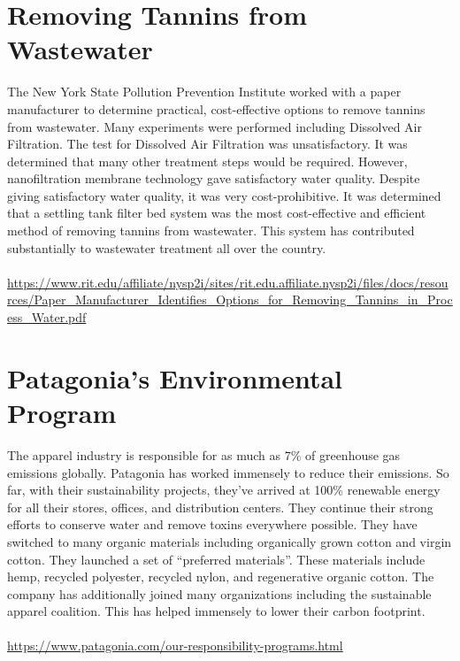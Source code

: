 \documentclass{article}
\begin{document}
\begin{spacing}{2.15}
    \section{Removing Tannins from Wastewater}
    \indent The New York State Pollution Prevention Institute worked with a paper manufacturer to determine practical, cost-effective options to remove tannins from wastewater. Many experiments were performed including Dissolved Air Filtration. The test for Dissolved Air Filtration was unsatisfactory. It was determined that many other treatment steps would be required. However, nanofiltration membrane technology gave satisfactory water quality. Despite giving satisfactory water quality, it was very cost-prohibitive. It was determined that a settling tank filter bed system was the most cost-effective and efficient method of removing tannins from wastewater. This system has contributed substantially to wastewater treatment all over the country.\\\\
    \url{https://www.rit.edu/affiliate/nysp2i/sites/rit.edu.affiliate.nysp2i/files/docs/resources/Paper_Manufacturer_Identifies_Options_for_Removing_Tannins_in_Process_Water.pdf}
    \newpage
    \section{Patagonia's Environmental Program}
    \indent The apparel industry is responsible for as much as 7\% of greenhouse gas emissions globally. Patagonia has worked immensely to reduce their emissions. So far, with their sustainability projects, they've arrived at 100\% renewable energy for all their stores, offices, and distribution centers. They continue their strong efforts to conserve water and remove toxins everywhere possible. They have switched to many organic materials including organically grown cotton and virgin cotton. They launched a set of ``preferred materials''. These materials include hemp, recycled polyester, recycled nylon, and regenerative organic cotton. The company has additionally joined many organizations including the sustainable apparel coalition. This has helped immensely to lower their carbon footprint.\\\\
    \url{https://www.patagonia.com/our-responsibility-programs.html}

\end{spacing}
\end{document}
